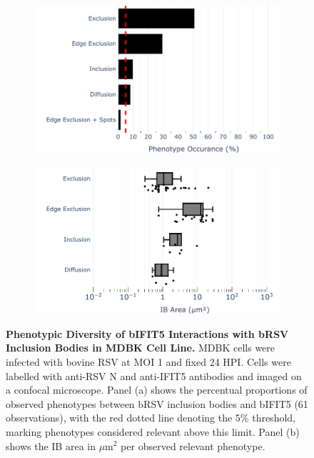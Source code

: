 \begin{figure}
    \begin{subfigure}{0.495\textwidth}
        \caption{}
        \includegraphics[width=1\linewidth]{08. Chapter 3/Figs/02. Infection/04. IFIT5/07. bar_i5_mdbk.pdf} 
    \end{subfigure}
    \begin{subfigure}{0.495\textwidth}
        \caption{}
        \includegraphics[width=1\linewidth]{08. Chapter 3/Figs/02. Infection/04. IFIT5/08. box_i5_mdbk.pdf}
    \end{subfigure}
    \caption[Phenotypic Diversity of bIFIT5 Interactions with bRSV Inclusion Bodies in MDBK Cell Line.]{\textbf{Phenotypic Diversity of bIFIT5 Interactions with bRSV Inclusion Bodies in MDBK Cell Line.} MDBK cells were infected with bovine RSV at MOI 1 and fixed 24 HPI. Cells were labelled with anti-RSV N and anti-IFIT5 antibodies and imaged on a confocal microscope. Panel (a) shows the percentual proportions of observed phenotypes between bRSV inclusion bodies and bIFIT5 (61 observations), with the red dotted line denoting the 5\% threshold, marking phenotypes considered relevant above this limit. Panel (b) shows the IB area in \(\mu \mbox{m}^2\) per observed relevant phenotype.}
    \label{fig:Phenotypic Diversity of bIFIT5 Interactions with bRSV Inclusion Bodies in MDBK Cell Line}
\end{figure}

